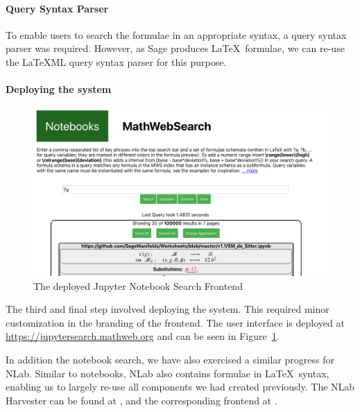 \paragraph{Query Syntax Parser}

To enable users to search the formulae in an appropriate syntax, a query syntax parser was required. 
However, as Sage produces \LaTeX\ formulae, we can re-use the {\LaTeX}ML query syntax parser for this purpose. 

\paragraph{Deploying the system}

\begin{figure}[ht]
  \includegraphics[width=\textwidth]{mwsnotebookfront.png}
  \caption{The deployed Jupyter Notebook Search Frontend}\label{fig:mwsnotebookfront}
\end{figure}

The third and final step involved deploying the system.
This required minor customization in the branding of the frontend. 
The user interface is deployed at \url{https://jupytersearch.mathweb.org} and can be seen in Figure~\ref{fig:mwsnotebookfront}.

In addition the notebook search, we have also exercised a similar progress for NLab. 
Similar to notebooks, NLab also contains formulae in \LaTeX\ syntax, enabling us to largely re-use all components we had created previously.
The NLab Harvester can be found at , and the corresponding frontend at . 


